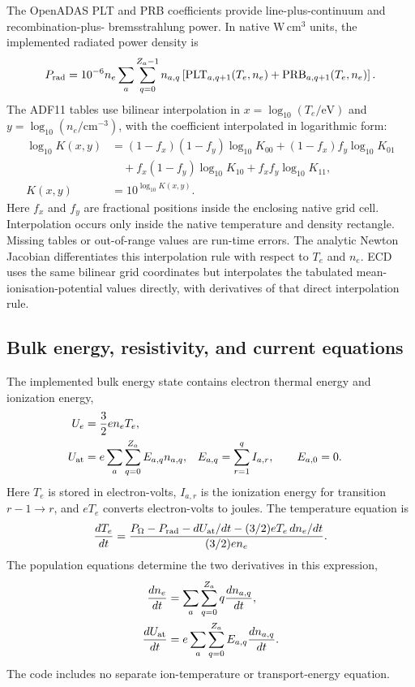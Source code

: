 \documentclass[11pt]{article}
\begin{document}
The OpenADAS PLT and PRB coefficients provide line-plus-continuum and recombination-plus-
bremsstrahlung power.  In native $\mathrm{W\,cm^3}$ units, the implemented radiated power
density is
\begin{equation}
 P_{\rm rad}=10^{-6}n_e\sum_a\sum_{q=0}^{Z_a-1}
 n_{a,q}\left[\mathrm{PLT}_{a,q+1}(T_e,n_e)+\mathrm{PRB}_{a,q+1}(T_e,n_e)\right].
 \label{eq:bulk_radiated_power}
\end{equation}
The ADF11 tables use bilinear interpolation in
$x=\log_{10}(T_e/\mathrm{eV})$ and $y=\log_{10}(n_e/\mathrm{cm^{-3}})$, with the
coefficient interpolated in logarithmic form:
\begin{align}
 \log_{10}K(x,y)&=(1-f_x)(1-f_y)\log_{10}K_{00}
 +(1-f_x)f_y\log_{10}K_{01}\\
 &\quad+f_x(1-f_y)\log_{10}K_{10}+f_xf_y\log_{10}K_{11},\\
 K(x,y)&=10^{\log_{10}K(x,y)}.
 \label{eq:bulk_adas_interpolation}
\end{align}
Here $f_x$ and $f_y$ are fractional positions inside the enclosing native grid cell.
Interpolation occurs only inside the native temperature and density rectangle.  Missing
tables or out-of-range values are run-time errors.
The analytic Newton Jacobian differentiates this interpolation rule with respect to
$T_e$ and $n_e$.  ECD uses the same bilinear grid coordinates but interpolates the
tabulated mean-ionisation-potential values directly, with derivatives of that direct
interpolation rule.

\subsection{Bulk energy, resistivity, and current equations}

The implemented bulk energy state contains electron thermal energy and ionization energy,
\begin{align}
 U_e &= \frac32 e n_e T_e,\\
 U_{\rm at} &= e\sum_a\sum_{q=0}^{Z_a}E_{a,q}n_{a,q},
 & E_{a,q}&=\sum_{r=1}^{q}I_{a,r},\qquad E_{a,0}=0.
 \label{eq:bulk_energies}
\end{align}
Here $T_e$ is stored in electron-volts, $I_{a,r}$ is the ionization energy for transition
$r-1\to r$, and $eT_e$ converts electron-volts to joules.  The temperature equation is
\begin{equation}
 \frac{dT_e}{dt}
 =\frac{P_\Omega-P_{\rm rad}-dU_{\rm at}/dt
 -(3/2)eT_e\,dn_e/dt}{(3/2)e n_e}.
 \label{eq:bulk_temperature_rhs}
\end{equation}
The population equations determine the two derivatives in this expression,
\begin{align}
 \frac{dn_e}{dt}&=\sum_a\sum_{q=0}^{Z_a}q\frac{dn_{a,q}}{dt},\\
 \frac{dU_{\rm at}}{dt}&=e\sum_a\sum_{q=0}^{Z_a}E_{a,q}\frac{dn_{a,q}}{dt}.
 \label{eq:bulk_energy_derivatives}
\end{align}
The code includes no separate ion-temperature or transport-energy equation.
\end{document}

